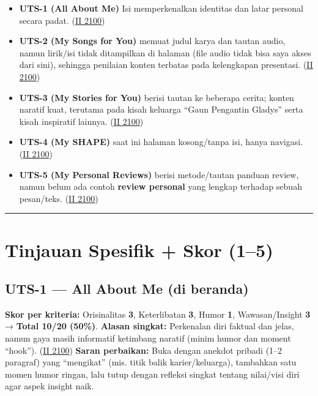 \documentclass[
  letterpaper,
  DIV=11,
  numbers=noendperiod]{scrreprt}
\providecommand{\tightlist}{%
  \setlength{\itemsep}{0pt}\setlength{\parskip}{0pt}}
\begin{document}
\begin{itemize}
\tightlist
\item
  \textbf{UTS-1 (All About Me)} Isi memperkenalkan identitas dan latar
  personal secara padat.
  (\href{https://ii-2100.github.io/all-about-me/}{II 2100})
\item
  \textbf{UTS-2 (My Songs for You)} memuat judul karya dan tautan audio,
  namun lirik/isi tidak ditampilkan di halaman (file audio tidak bisa
  saya akses dari sini), sehingga penilaian konten terbatas pada
  kelengkapan presentasi.
  (\href{https://ii-2100.github.io/all-about-me/My_Song_for_You/index.html}{II
  2100})
\item
  \textbf{UTS-3 (My Stories for You)} berisi tautan ke beberapa cerita;
  konten naratif kuat, terutama pada kisah keluarga ``Gaun Pengantin
  Gladys'' serta kisah inspiratif lainnya.
  (\href{https://ii-2100.github.io/all-about-me/My_Stories_for_You/index.html}{II
  2100})
\item
  \textbf{UTS-4 (My SHAPE)} saat ini halaman kosong/tanpa isi, hanya
  navigasi.
  (\href{https://ii-2100.github.io/all-about-me/My_Shapes/index.html}{II
  2100})
\item
  \textbf{UTS-5 (My Personal Reviews)} berisi metode/tautan panduan
  review, namun belum ada contoh \textbf{review personal} yang lengkap
  terhadap sebuah pesan/teks.
  (\href{https://ii-2100.github.io/all-about-me/My_Personal_Reviews/index.html}{II
  2100})
\end{itemize}

\begin{center}\rule{0.5\linewidth}{0.5pt}\end{center}

\section{Tinjauan Spesifik + Skor
(1--5)}\label{tinjauan-spesifik-skor-15}

\subsection{UTS-1 --- All About Me (di
beranda)}\label{uts-1-all-about-me-di-beranda}

\textbf{Skor per kriteria:} Orisinalitas \textbf{3}, Keterlibatan
\textbf{3}, Humor \textbf{1}, Wawasan/Insight \textbf{3} → \textbf{Total
10/20 (50\%)}. \textbf{Alasan singkat:} Perkenalan diri faktual dan
jelas, namun gaya masih informatif ketimbang naratif (minim humor dan
moment ``hook''). (\href{https://ii-2100.github.io/all-about-me/}{II
2100}) \textbf{Saran perbaikan:} Buka dengan anekdot pribadi (1--2
paragraf) yang ``mengikat'' (mis. titik balik karier/keluarga),
tambahkan satu momen humor ringan, lalu tutup dengan refleksi singkat
tentang nilai/visi diri agar aspek insight naik.
\end{document}
